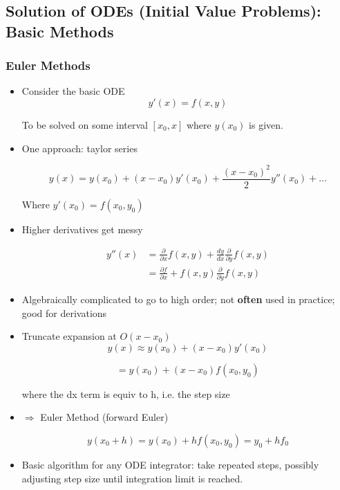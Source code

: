 \subsection{Solution of ODEs (Initial Value Problems): Basic Methods}

\subsubsection{Euler Methods}

\begin{itemize}
    \item Consider the basic ODE
    \[ y'(x) = f(x,y)\]

    To be solved on some interval $[x_0, x]$ where $y(x_0)$ is given.
    \item One approach: taylor series

    \[ y(x) = y(x_0) + (x-x_0) y'(x_0) + \frac{(x-x_0)^2}{2} y''(x_0) + \ldots\]

    Where $y'(x_0)=f(x_0,y_0)$
    \item Higher derivatives get messy

    \begin{equation*}
    \begin{aligned}
    y''(x) & = \frac{\partial}{\partial x} f(x,y) + \frac{dy}{dx} \frac{\partial }{\partial y} f(x,y) \\
    & = \frac{\partial f}{\partial x} + f(x,y) \frac{\partial}{\partial y} f(x,y) 
    \end{aligned}
    \end{equation*}
    
    \item Algebraically complicated to go to high order; not \textbf{often} used in practice; good for derivations

    \item Truncate expansion at $O(x-x_0)$
    \[ y(x) \approx y(x_0) + (x-x_0) y'(x_0)\]

    \[ = y(x_0)+(x-x_0)f(x_0,y_0)\]

    where the dx term is equiv to h, i.e. the step size

    \item $\Rightarrow$ Euler Method (forward Euler)

    \begin{equation}
        y(x_0+h) = y(x_0)+h f(x_0, y_0) = y_0 + h f_0
    \end{equation}

    \item Basic algorithm for any ODE integrator: take repeated steps, possibly adjusting step size until integration limit is reached.


\end{itemize}
